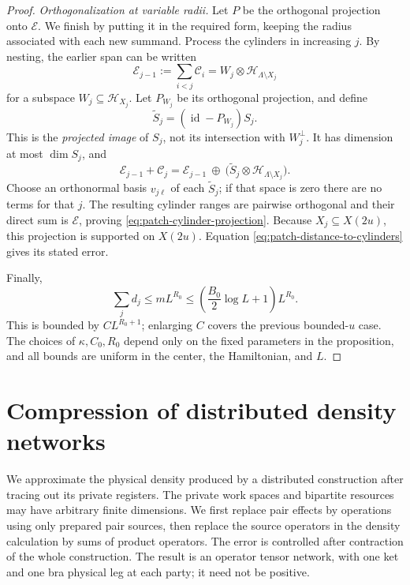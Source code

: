 \documentclass[11pt]{article}
\numberwithin{equation}{section}
\theoremstyle{definition}
\theoremstyle{remark}
\begin{document}
\begin{proof}
\emph{Orthogonalization at variable radii.}
Let \(P\) be the orthogonal projection onto \(\mathcal E\).
We finish by putting it in the required form, keeping the radius
associated with each new summand.  Process the cylinders in
increasing \(j\).  By nesting, the earlier span can be written
\[
 \mathcal E_{j-1}:=\sum_{i<j}\mathcal C_i
       =W_j\otimes\mathcal H_{\Lambda\setminus X_j}
\]
for a subspace \(W_j\subseteq\mathcal H_{X_j}\).
Let \(P_{W_j}\) be its orthogonal projection, and define
\[
 \widetilde S_j=(\operatorname{id}-P_{W_j})S_j.
\]
This is the \emph{projected image} of \(S_j\), not its intersection
with \(W_j^\perp\).  It has dimension at most \(\dim S_j\), and
\[
 \mathcal E_{j-1}+\mathcal C_j
    =\mathcal E_{j-1}\ \mathbin{\oplus}\
       \bigl(\widetilde S_j
                    \otimes\mathcal H_{\Lambda\setminus X_j}\bigr).
\]
Choose an orthonormal basis \(v_{j\ell}\) of each
\(\widetilde S_j\); if that space is zero there are no terms for
that \(j\).  The resulting cylinder ranges are pairwise orthogonal
and their direct sum is \(\mathcal E\), proving
\eqref{eq:patch-cylinder-projection}.  Because \(X_j\subseteq X(2u)\),
this projection is supported on \(X(2u)\).  Equation
\eqref{eq:patch-distance-to-cylinders} gives its stated error.

Finally,
\[
 \sum_j d_j\leq mL^{R_0}
       \leq \left(\frac{B_0}{2}\log L+1\right)L^{R_0}.
\]
This is bounded by \(C L^{R_0+1}\); enlarging \(C\) covers the
previous bounded-\(u\) case.  The choices of \(\kappa,C_0,R_0\)
depend only on the fixed parameters in the proposition, and all
bounds are uniform in the center, the Hamiltonian, and \(L\).
\end{proof}

\section{Compression of distributed density networks}
\label{sec:compression}

We approximate the physical density produced by a distributed construction
after tracing out its private registers.  The private work spaces and
bipartite resources may have arbitrary finite dimensions.  We first replace
pair effects by operations using only prepared pair sources, then replace
the source operators in the density calculation by sums of product
operators.  The error is
controlled after contraction of the whole construction.  The result is an
operator tensor network, with one ket and one bra physical leg at each
party; it need not be positive.
\end{document}
